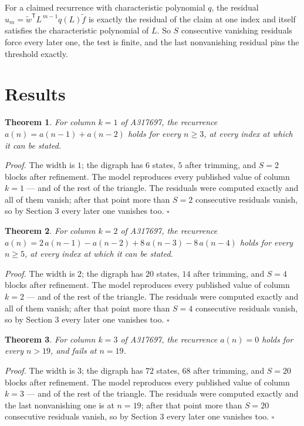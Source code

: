 \documentclass[11pt]{article}
\newtheorem{theorem}{Theorem}
\theoremstyle{definition}
\begin{document}
For a claimed recurrence with characteristic polynomial $q$, the residual $u_m = \tilde w^{\mathsf T}L^{\,m-1}q(L)\tilde f$ is exactly the residual of the claim at one index and itself satisfies the characteristic polynomial of $L$. So $S$ consecutive vanishing residuals force every later one, the test is finite, and the last nonvanishing residual pins the threshold exactly.

\section{Results}

\begin{theorem} For column $k = 1$ of A317697, the recurrence $a(n) = a(n-1) + a(n-2)$ holds for every $n \ge 3$, at every index at which it can be stated.\end{theorem}

{\itshape Proof.} The width is $1$; the digraph has $6$ states, $5$ after trimming, and $S = 2$ blocks after refinement. The model reproduces every published value of column $k = 1$ --- and of the rest of the triangle. The residuals were computed exactly and all of them vanish; after that point more than $S = 2$ consecutive residuals vanish, so by Section 3 every later one vanishes too. $\square$

\begin{theorem} For column $k = 2$ of A317697, the recurrence $a(n) = 2\,a(n-1) - a(n-2) + 8\,a(n-3) - 8\,a(n-4)$ holds for every $n \ge 5$, at every index at which it can be stated.\end{theorem}

{\itshape Proof.} The width is $2$; the digraph has $20$ states, $14$ after trimming, and $S = 4$ blocks after refinement. The model reproduces every published value of column $k = 2$ --- and of the rest of the triangle. The residuals were computed exactly and all of them vanish; after that point more than $S = 4$ consecutive residuals vanish, so by Section 3 every later one vanishes too. $\square$

\begin{theorem} For column $k = 3$ of A317697, the recurrence $a(n) = 0$ holds for every $n > 19$, and fails at $n = 19$.\end{theorem}

{\itshape Proof.} The width is $3$; the digraph has $72$ states, $68$ after trimming, and $S = 20$ blocks after refinement. The model reproduces every published value of column $k = 3$ --- and of the rest of the triangle. The residuals were computed exactly and the last nonvanishing one is at $n = 19$; after that point more than $S = 20$ consecutive residuals vanish, so by Section 3 every later one vanishes too. $\square$
\end{document}

